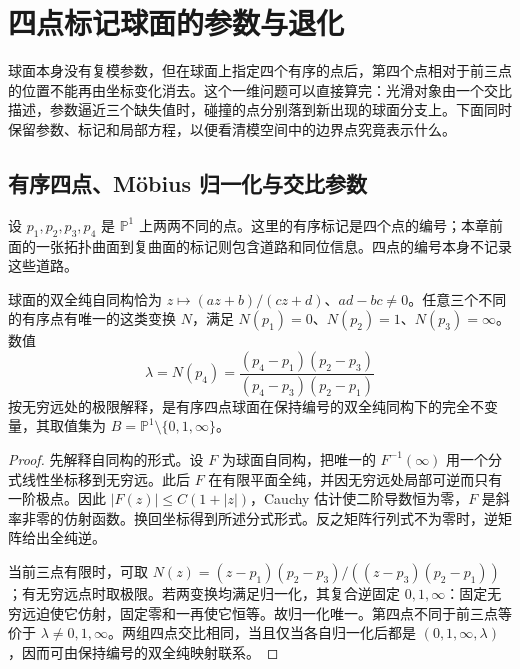 
% 
% 
% 
% 

\section{四点标记球面的参数与退化}
\label{g4:sec:0605}

球面本身没有复模参数，但在球面上指定四个有序的点后，第四个点相对于前三点的位置不能再由坐标变化消去。这个一维问题可以直接算完：光滑对象由一个交比描述，参数逼近三个缺失值时，碰撞的点分别落到新出现的球面分支上。下面同时保留参数、标记和局部方程，以便看清模空间中的边界点究竟表示什么。

\subsection{有序四点、Möbius 归一化与交比参数}
\label{g4:subsec:0605:01}
设 \(p_1,p_2,p_3,p_4\) 是 \(\mathbb P^1\) 上两两不同的点。这里的有序标记是四个点的编号；本章前面的一张拓扑曲面到复曲面的标记则包含道路和同位信息。四点的编号本身不记录这些道路。

\begin{proposition}
	\label{g4:prop:0605:cross-ratio}
	球面的双全纯自同构恰为 \(z\mapsto(az+b)/(cz+d)\)、\(ad-bc\ne0\)。任意三个不同的有序点有唯一的这类变换 \(N\)，满足 \(N(p_1)=0\)、\(N(p_2)=1\)、\(N(p_3)=\infty\)。数值
	\[
		\lambda=N(p_4)=\frac{(p_4-p_1)(p_2-p_3)}{(p_4-p_3)(p_2-p_1)}
	\]
	按无穷远处的极限解释，是有序四点球面在保持编号的双全纯同构下的完全不变量，其取值集为 \(B=\mathbb P^1\setminus\{0,1,\infty\}\)。
\end{proposition}
\begin{proof}
	先解释自同构的形式。设 \(F\) 为球面自同构，把唯一的 \(F^{-1}(\infty)\) 用一个分式线性坐标移到无穷远。此后 \(F\) 在有限平面全纯，并因无穷远处局部可逆而只有一阶极点。因此 \(|F(z)|\le C(1+|z|)\)，Cauchy 估计使二阶导数恒为零，\(F\) 是斜率非零的仿射函数。换回坐标得到所述分式形式。反之矩阵行列式不为零时，逆矩阵给出全纯逆。

	当前三点有限时，可取 \(N(z)=(z-p_1)(p_2-p_3)/((z-p_3)(p_2-p_1))\)；有无穷远点时取极限。若两变换均满足归一化，其复合逆固定 \(0,1,\infty\)：固定无穷远迫使它仿射，固定零和一再使它恒等。故归一化唯一。第四点不同于前三点等价于 \(\lambda\ne0,1,\infty\)。两组四点交比相同，当且仅当各自归一化后都是 \((0,1,\infty,\lambda)\)，因而可由保持编号的双全纯映射联系。
\end{proof}

